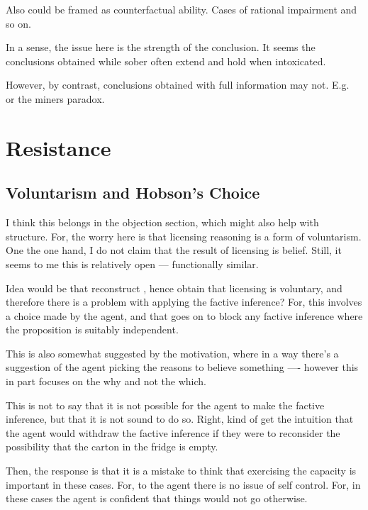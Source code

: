 \documentclass[10pt]{article}
\begin{document}
\begin{note}[Counterfactual]
Also could be framed as counterfactual ability.
Cases of rational impairment and so on.

In a sense, the issue here is the strength of the conclusion.
It seems the conclusions obtained while sober often extend and hold when intoxicated.

However, by contrast, conclusions obtained with full information may not.
E.g.\ \cite{Smith:2004aa} or the miners paradox.
\end{note}

\section{Resistance}
\label{sec:resistance}


\subsection{Voluntarism and Hobson's Choice}
\label{sec:non-voluntarism}

\begin{note}[Grr]
  I think this belongs in the objection section, which might also help with structure.
  For, the worry here is that licensing reasoning is a form of voluntarism.
  One the one hand, I do not claim that the result of licensing is belief.
  Still, it seems to me this is relatively open --- functionally similar.

  Idea would be that reconstruct \citeauthor{Weatherson:2008uq}, hence obtain that licensing is voluntary, and therefore there is a problem with applying the factive inference?
  For, this involves a choice made by the agent, and that goes on to block any factive inference where the proposition is suitably independent.

  This is also somewhat suggested by the \citeauthor{Davidson:2001aa} motivation, where in a way there's a suggestion of the agent picking the reasons to believe something ---- however this in part focuses on the why and not the which.

  This is not to say that it is not possible for the agent to make the factive inference, but that it is not sound to do so.
  Right, kind of get the intuition that the agent would withdraw the factive inference if they were to reconsider the possibility that the carton in the fridge is empty.

  Then, the response is that it is a mistake to think that exercising the capacity is important in these cases.
  For, to the agent there is no issue of self control.
  For, in these cases the agent is confident that things would not go otherwise.
\end{note}
\end{document}
